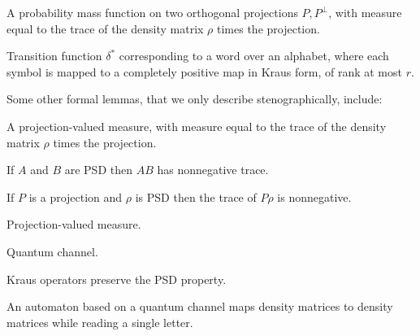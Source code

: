 \begin{lemma}\label{PMF_of_state}
	\leanok
A probability mass function on two orthogonal projections $P, P^{\bot}$,
with measure equal to the trace of the density matrix $\rho$ times the projection.
\end{lemma}

\begin{definition}\label{krausApplyWord}
	\leanok
	Transition function $\delta^*$ corresponding to a word over an alphabet,
	  where each symbol is mapped to a completely positive map in Kraus form,
	  of rank at most $r$.
\end{definition}

Some other formal lemmas, that we only describe stenographically, include:

\begin{lemma}\label{PVM_of_state}
	\leanok
A projection-valued measure, with measure equal to the trace of the density matrix $\rho$ times the projection.
\end{lemma}

\begin{lemma}\label{trace_mul_posSemidef_nonneg}
	\leanok
	If $A$ and $B$ are PSD then $AB$ has nonnegative trace.
\end{lemma}

\begin{lemma}\label{trace_mul_nonneg}
	\leanok
	If $P$ is a projection and $\rho$ is PSD then the trace of $P\rho$ is nonnegative.
\end{lemma}

\begin{definition}\label{PVM}
	\leanok
	Projection-valued measure.
\end{definition}

\begin{definition}\label{QuantumChannel}
	\leanok
	Quantum channel.
\end{definition}
\begin{lemma}\label{krausApply.posSemidef}
	\leanok
	Kraus operators preserve the PSD property.
\end{lemma}

\begin{lemma}\label{densityMatrix.applyChannel}
	\leanok
	An automaton based on a quantum channel maps density matrices to density matrices while reading a single letter.
\end{lemma}

